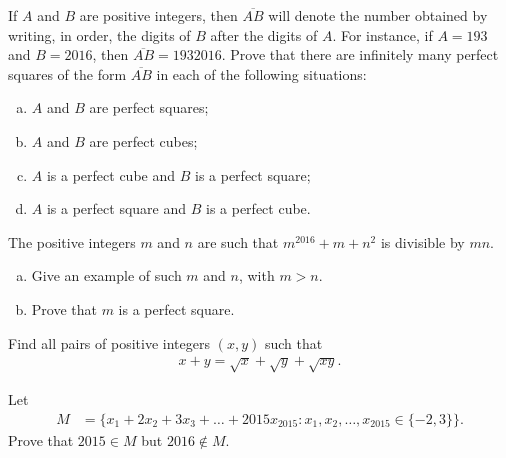 \documentclass[problems.tex]{subfile}
\begin{document}
	
	\begin{problem}
		If $A$ and $B$ are positive integers, then $\overline{AB}$ will denote the number obtained by writing, in order, the digits of $B$ after the digits of $A$. For instance, if $A = 193$ and $B = 2016$, then $\overline{AB} = 1932016$.
		Prove that there are infinitely many perfect squares of the form $\overline{AB}$ in each of the following situations:
		\begin{enumerate}[(a)]
			\item $A$ and $B$ are perfect squares;
			\item $A$ and $B$ are perfect cubes;
			\item $A$ is a perfect cube and $B$ is a perfect square;
			\item $A$ is a perfect square and $B$ is a perfect cube.
		\end{enumerate}
	\end{problem}
	
	
	\begin{problem}
		The positive integers $m$ and $n$ are such that $m^{2016}+m+n^2$ is divisible
		by $mn$.
		\begin{enumerate}[(a)]
			\item Give an example of such $m$ and $n$, with $m > n$.
			\item Prove that $m$ is a perfect square.
		\end{enumerate}
	\end{problem}
	
	
	\begin{problem}
		Find all pairs of positive integers $(x,y)$ such that
		\begin{align*}
			x + y = \sqrt x + \sqrt y + \sqrt{xy}.
		\end{align*}
	\end{problem}
	
	
	
	\begin{problem}
		Let
		\begin{align*}
			M &= \bigg\{x_1 + 2x_2 + 3x_3 + \dots + 2015x_{2015} : x_1, x_2, \dots, 	x_{2015} \in \{-2, 3\}\bigg\}.
		\end{align*}
		Prove that $2015 \in M$ but $2016 \not \in M$.
	\end{problem}
	
\end{document}
